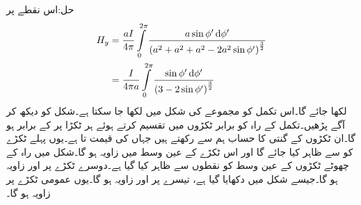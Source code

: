 حل:اس نقطے پر 
\begin{align*}
H_y&=\frac{aI}{4\pi}\int\limits_0^{2\pi} \frac{a\sin \phi' \dif \phi'}{\left(a^2+a^2+a^2-2 a^2\sin \phi'\right)^{\frac{3}{2}}}\\
&=\frac{I}{4\pi a}\int\limits_0^{2\pi} \frac{\sin \phi' \dif \phi'}{\left(3-2\sin \phi'\right)^{\frac{3}{2}}}
\end{align*}
لکھا جائے گا۔اس تکمل کو مجموعے کی شکل میں لکھا جا سکتا ہے۔شکل  کو دیکھ کر آگے پڑھیں۔تکمل کے راہ کو  برابر ٹکڑوں میں تقسیم کرتے  ہوئے ہر ٹکڑا پر
  کے برابر ہو گا۔ان ٹکڑوں کے گنتی کا حساب ہم  سے رکھتے ہیں جہاں  کی قیمت  تا  ہے۔یوں پہلے ٹکڑے کو  سے ظاہر کیا جائے گا اور اس ٹکڑے کے عین وسط میں زاویہ  ہو گا۔شکل میں راہ کے چھوٹے ٹکڑوں کے عین وسط کو نقطوں سے ظاہر کیا گیا ہے۔دوسرے ٹکڑے پر  اور زاویہ  ہو گا۔جیسے شکل میں دکھایا گیا ہے، تیسرے پر  اور زاویہ   ہو گا۔یوں عمومی ٹکڑے  پر زاویہ
  ہو گا۔

